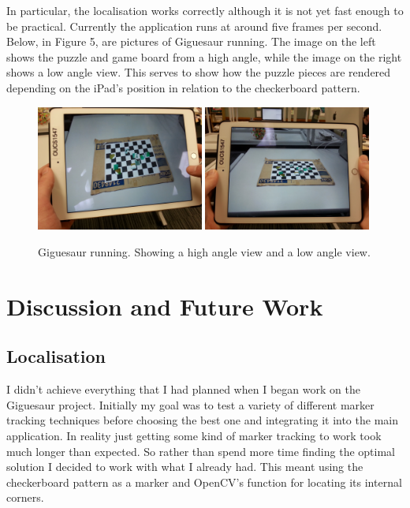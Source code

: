 \documentclass{article}
\begin{document}
In particular, the localisation works correctly although it is not yet fast enough to be practical. Currently the application runs at around five frames per second. Below, in Figure 5, are pictures of Giguesaur running. The image on the left shows the puzzle and game board from a high angle, while the image on the right shows a low angle view. This serves to show how the puzzle pieces are rendered depending on the iPad's position in relation to the checkerboard pattern. 


\begin{figure}[H]
\begin{center}
\includegraphics[width=0.49\textwidth]{high_angle}
\includegraphics[width=0.49\textwidth]{low_angle}
\caption{Giguesaur running. Showing a high angle view and a low angle view. }
\end{center}
\end{figure}


\section{Discussion and Future Work}

\subsection{Localisation}
I didn't achieve everything that I had planned when I began work on the Giguesaur project. Initially my goal was to test a variety of different marker tracking techniques before choosing the best one and integrating it into the main application. In reality just getting some kind of marker tracking to work took much longer than expected. So rather than spend more time finding the optimal solution I decided to work with what I already had. This meant using the checkerboard pattern as a marker and OpenCV's function for locating its internal corners. 
\end{document}
